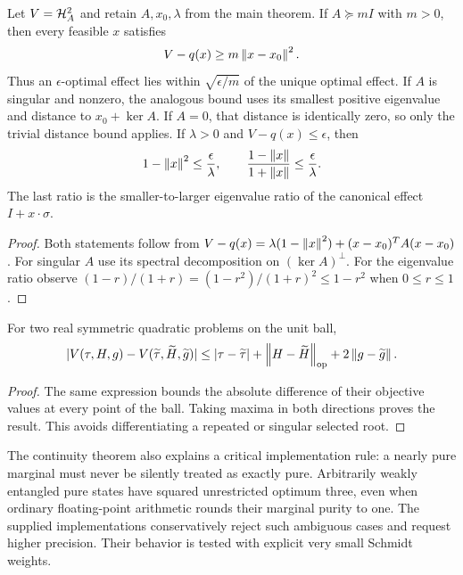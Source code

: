 \begin{proposition}
\label{prop:stability}
Let $V=\mathcal H_A^2$ and retain $A,x_0,\lambda$ from the main theorem.
If $A\succeq mI$ with $m>0$, then every feasible $x$ satisfies
\begin{equation}\label{eq:coercive}
 V-q(x)\geq m\left\lVert x-x_0\right\rVert^2.
\end{equation}
Thus an $\epsilon$-optimal effect lies within
$\sqrt{\epsilon/m}$ of the unique optimal effect. If $A$ is singular
and nonzero, the analogous bound uses its smallest positive eigenvalue
and distance to $x_0+\ker A$. If $A=0$, that distance is identically
zero, so only the trivial distance bound applies.
If $\lambda>0$ and $V-q(x)\leq\epsilon$, then
\begin{equation}\label{eq:condition}
 1-\left\lVert x\right\rVert^2\leq\frac\epsilon\lambda,
 \qquad\frac{1-\left\lVert x\right\rVert}{1+\left\lVert x\right\rVert}\leq\frac\epsilon\lambda.
\end{equation}
The last ratio is the smaller-to-larger eigenvalue ratio of the canonical
effect $I+x\cdot\sigma$.
\end{proposition}
\begin{proof}
Both statements follow from
$V-q(x)=\lambda(1-\left\lVert x\right\rVert^2)+(x-x_0)^TA(x-x_0)$.
For singular $A$ use its spectral decomposition on $(\ker A)^\perp$.
For the eigenvalue ratio observe
$(1-r)/(1+r)=(1-r^2)/(1+r)^2\leq1-r^2$ when $0\leq r\leq1$.
\end{proof}

\begin{proposition}
For two real symmetric quadratic problems on the unit ball,
\[
 |V(\tau,H,g)-V(\widetilde\tau,\widetilde H,\widetilde g)|
 \leq|\tau-\widetilde\tau|+\left\lVert H-\widetilde H\right\rVert_{\rm op}
          +2\left\lVert g-\widetilde g\right\rVert.
\]
\end{proposition}
\begin{proof}
The same expression bounds the absolute difference of their objective
values at every point of the ball. Taking maxima in both directions proves
the result. This avoids differentiating a repeated or singular selected root.
\end{proof}

The continuity theorem also explains a critical implementation rule:
a nearly pure marginal must never be silently treated as exactly pure.
Arbitrarily weakly entangled pure states have squared unrestricted optimum
three, even when ordinary floating-point arithmetic rounds their marginal
purity to one. The supplied implementations conservatively reject such
ambiguous cases and request higher precision. Their behavior is tested
with explicit very small Schmidt weights.

